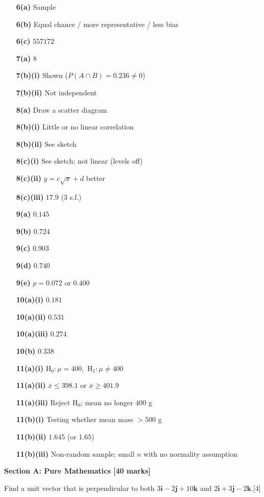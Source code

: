 \documentclass[a4paper,11pt,oneside]{article}
\newcommand{\Qhead}[1]{\par\needspace{14\baselineskip}\medskip\noindent{\large\bfseries #1}\par\smallskip}
\newcommand{\mk}[1]{\hfill[#1]}
\newcommand{\ii}{\mathbf{i}}
\newcommand{\jj}{\mathbf{j}}
\newcommand{\kk}{\mathbf{k}}
\begin{document}
\begin{itemize}[leftmargin=2.0em,itemsep=0.02ex,topsep=0.05ex,parsep=0pt]
\item[\textbf{6(a)}] Sample
\item[\textbf{6(b)}] Equal chance / more representative / less bias
\item[\textbf{6(c)}] $557172$
\item[\textbf{7(a)}] $8$
\item[\textbf{7(b)(i)}] Shown ($P(A\cap B)=0.236\neq 0$)
\item[\textbf{7(b)(ii)}] Not independent
\item[\textbf{8(a)}] Draw a scatter diagram
\item[\textbf{8(b)(i)}] Little or no linear correlation
\item[\textbf{8(b)(ii)}] See sketch
\item[\textbf{8(c)(i)}] See sketch; not linear (levels off)
\item[\textbf{8(c)(ii)}] $y=c\sqrt{x}+d$ better
\item[\textbf{8(c)(iii)}] $17.9$ (3 s.f.)
\item[\textbf{9(a)}] $0.145$
\item[\textbf{9(b)}] $0.724$
\item[\textbf{9(c)}] $0.903$
\item[\textbf{9(d)}] $0.740$
\item[\textbf{9(e)}] $p=0.072$ or $0.400$
\item[\textbf{10(a)(i)}] $0.181$
\item[\textbf{10(a)(ii)}] $0.531$
\item[\textbf{10(a)(iii)}] $0.274$
\item[\textbf{10(b)}] $0.338$
\item[\textbf{11(a)(i)}] $\mathrm{H}_0:\mu=400$,\ $\mathrm{H}_1:\mu\neq 400$
\item[\textbf{11(a)(ii)}] $\bar{x}\le 398.1$ or $\bar{x}\ge 401.9$
\item[\textbf{11(a)(iii)}] Reject $\mathrm{H}_0$; mean no longer $400$ g
\item[\textbf{11(b)(i)}] Testing whether mean mass $>500$ g
\item[\textbf{11(b)(ii)}] $1.645$ (or $1.65$)
\item[\textbf{11(b)(iii)}] Non-random sample; small $n$ with no normality assumption
\end{itemize}
\clearpage
\noindent\textbf{Section A: Pure Mathematics [40 marks]}
\Qhead{1}
Find a unit vector that is perpendicular to both $3\ii - 2\jj + 10\kk$ and $2\ii + 3\jj - 2\kk$.\mk{4}
\end{document}
